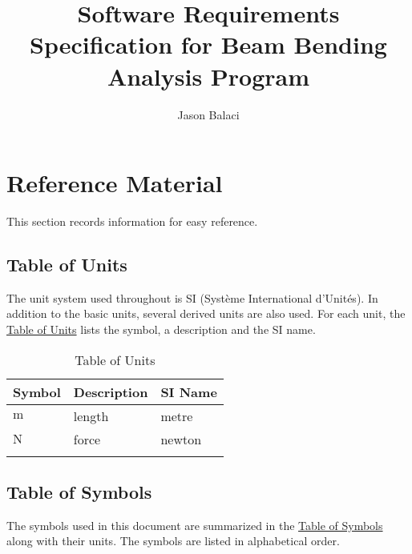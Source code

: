 \documentclass[12pt]{article}
\title{Software Requirements Specification for Beam Bending Analysis Program}
\author{Jason Balaci}
\begin{document}
\maketitle
\tableofcontents
\newpage
\section{Reference Material}
\label{Sec:RefMat}
This section records information for easy reference.

\subsection{Table of Units}
\label{Sec:ToU}
The unit system used throughout is SI (Système International d'Unités). In addition to the basic units, several derived units are also used. For each unit, the \hyperref[Table:ToU]{Table of Units} lists the symbol, a description and the SI name.

\begin{longtable}{l l l}
\toprule
\textbf{Symbol} & \textbf{Description} & \textbf{SI Name}
\\
\midrule
\endhead
${\text{m}}$ & length & metre
\\
${\text{N}}$ & force & newton
\\
\bottomrule
\caption{Table of Units}
\label{Table:ToU}
\end{longtable}
\subsection{Table of Symbols}
\label{Sec:ToS}
The symbols used in this document are summarized in the \hyperref[Table:ToS]{Table of Symbols} along with their units. The symbols are listed in alphabetical order.
\end{document}
